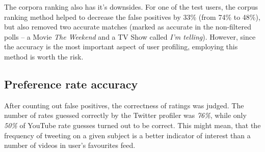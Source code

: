 The corpora ranking also has it's downsides. For one of the test users, the corpus ranking method helped to
decrease the false positives by 33\% (from 74\% to 48\%), but also removed two accurate matches (marked as
accurate in the non-filtered polls -- a Movie \textit{The Weekend} and a TV Show called \textit{I'm telling}).
However, since the accuracy is the most important aspect of user profiling, employing this method is worth
the risk.

\subsection{Preference rate accuracy}
After counting out false positives, the correctness of ratings was judged. The
number of rates guessed correctly by the Twitter profiler was \textit{76\%},
while only \textit{50\%} of YouTube rate guesses turned out to be correct. This
might mean, that the frequency of tweeting on a given subject is a better
indicator of interest than a number of videos in user's favourites feed.
